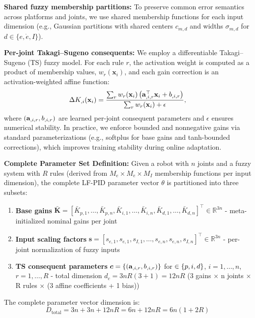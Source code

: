 \documentclass[DTMColor]{ROB-New}
\begin{document}
    \textbf{Shared fuzzy membership partitions:} To preserve common error semantics across platforms and joints, we use shared membership functions for each input dimension (e.g., Gaussian partitions with shared centers $c_{m,d}$ and widths $\sigma_{m,d}$ for $d \in \{e,\dot e,I\}$).

    \textbf{Per-joint Takagi--Sugeno consequents:} We employ a differentiable Takagi--Sugeno (TS) fuzzy model. For each rule $r$, the activation weight is computed as a product of membership values, $w_r(\mathbf{x}_i)$, and each gain correction is an activation-weighted affine function:
\begin{equation}
    \Delta K_{\*,i}(\mathbf{x}_i) = \frac{\sum_{r} w_r(\mathbf{x}_i)\,\big(\mathbf{a}_{\*,i,r}^\top\mathbf{x}_i + b_{\*,i,r}\big)}{\sum_{r} w_r(\mathbf{x}_i) + \epsilon},
\end{equation}
where $(\mathbf{a}_{\*,i,r}, b_{\*,i,r})$ are learned per-joint consequent parameters and $\epsilon$ ensures numerical stability. In practice, we enforce bounded and nonnegative gains via standard parameterizations (e.g., softplus for base gains and tanh-bounded corrections), which improves training stability during online adaptation.

\textbf{Complete Parameter Set Definition:} Given a robot with $n$ joints and a fuzzy system with $R$ rules (derived from $M_e \times M_{\dot e} \times M_I$ membership functions per input dimension), the complete LF-PID parameter vector $\theta$ is partitioned into three subsets:
\begin{enumerate}[leftmargin=*, itemsep=2pt]
    \item \textbf{Base gains} $\bar{\bm{K}} = [\bar{K}_{p,1},\ldots,\bar{K}_{p,n}, \bar{K}_{i,1},\ldots,\bar{K}_{i,n}, \bar{K}_{d,1},\ldots,\bar{K}_{d,n}]^\top \in \mathbb{R}^{3n}$ - meta-initialized nominal gains per joint
    \item \textbf{Input scaling factors} $\bm{s} = [s_{e,1}, s_{\dot e,1}, s_{I,1}, \ldots, s_{e,n}, s_{\dot e,n}, s_{I,n}]^\top \in \mathbb{R}^{3n}$ - per-joint normalization of fuzzy inputs
    \item \textbf{TS consequent parameters} $\bm{c} = \{(\mathbf{a}_{\*,i,r}, b_{\*,i,r})\}$ for $\* \in \{p,i,d\}$, $i=1,\ldots,n$, $r=1,\ldots,R$ - total dimension $d_c = 3nR(3+1) = 12nR$ (3 gains $\times$ n joints $\times$ R rules $\times$ (3 affine coefficients + 1 bias))
\end{enumerate}

The complete parameter vector dimension is:
\begin{equation}
    D_{\text{total}} = 3n + 3n + 12nR = 6n + 12nR = 6n(1 + 2R)
\end{equation}
\end{document}
